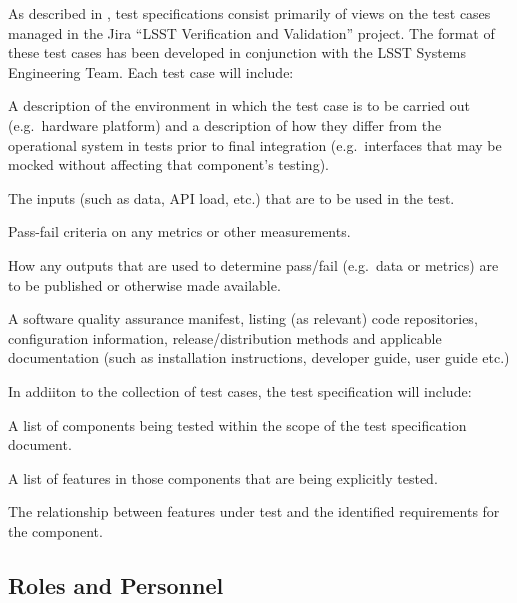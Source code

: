 As described in , test specifications consist primarily of views on the test cases managed in the Jira ``LSST Verification and Validation'' project.
The format of these test cases has been developed in conjunction with the LSST Systems Engineering Team.
Each test case will include:

\begin{itemize_single}

  \item{A description of the environment in which the test case is to be carried out (e.g.\ hardware platform) and a description of how they differ from the operational system in tests prior to final integration (e.g.\ interfaces that may be mocked without affecting that component's testing).}
  \item{The inputs (such as data, API load, etc.) that are to be used in the test.}
  \item{Pass-fail criteria on any metrics or other measurements.}
  \item{How any outputs that are used to determine pass/fail (e.g.\ data or metrics) are to be published or otherwise made available.}
  \item{A software quality assurance manifest, listing (as relevant) code repositories, configuration information, release/distribution methods and applicable documentation (such as installation instructions, developer guide, user guide etc.)}

\end{itemize_single}

In addiiton to the collection of test cases, the test specification will include:

\begin{itemize_single}

  \item{A list of components being tested within the scope of the test specification document.}
  \item{A list of features in those components that are being explicitly tested.}
  \item{The relationship between features under test and the identified requirements for the component.}

\end{itemize_single}

\subsection{Roles and Personnel}
\label{sect:roles}

